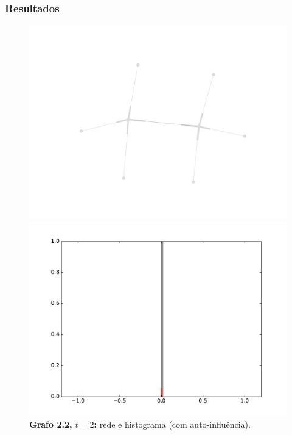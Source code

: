 \begin{frame}
  \frametitle{Resultados}

  \begin{figure}
  \centering
  \begin{minipage}{5.5cm}
    \includegraphics[width=\textwidth]{./figures/22SIN2}
  \end{minipage}
  \begin{minipage}{5.5cm}
    \includegraphics[width=\textwidth]{./figures/22SIH2}
  \end{minipage}
  \vspace{5mm}
  \caption*{\textbf{Grafo 2.2, $t = 2$:} rede e histograma (com auto-influência).}
  \end{figure}
\end{frame}

